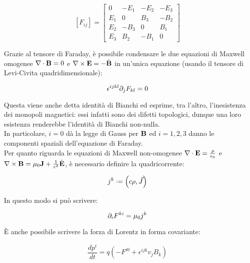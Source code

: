 \begin{equation}
	\left[F_{ij}\right] =
	\begin{bmatrix}
		0 & -E_1 & -E_2 & -E_3 \\
		E_1 & 0 & B_3 & -B_2 \\
		E_2 & -B_3 & 0 & B_1 \\
		E_3 & B_2 & -B_1 & 0
	\end{bmatrix}
	\label{eq:2.24}
\end{equation}

Grazie al tensore di Faraday, è possibile condensare le due equazioni di Maxwell omogenee $ \nabla\cdot\mathbf{B} = 0 $ e $ \nabla\times\mathbf{E} = - \dot{\mathbf{B}} $ in un'unica equazione (usando il tensore di Levi-Civita quadridimensionale):

\begin{equation}
	\epsilon^{ijkl} \partial_j F_{kl} = 0
	\label{eq:2.25}
\end{equation}

Questa viene anche detta identità di Bianchi ed esprime, tra l'altro, l'inesistenza dei monopoli magnetici: essi infatti sono dei difetti topologici, dunque una loro esistenza renderebbe l'identità di Bianchi non-nulla.\\
In particolare, $ i = 0 $ dà la legge di Gauss per $ \mathbf{B} $ ed $ i = 1,2,3 $ danno le componenti spaziali dell'equazione di Faraday.\\
Per quanto riguarda le equazioni di Maxwell non-omogenee $ \nabla\cdot\mathbf{E} = \frac{\rho}{\epsilon_0} $ e $ \nabla\times\mathbf{B} = \mu_0 \mathbf{J} + \frac{1}{c^2} \dot{\mathbf{E}} $, è necessario definire la quadricorrente:

\begin{equation}
	j^k \defeq \left(c\rho, \vec{J}\right)
	\label{eq:2.26}
\end{equation}

In questo modo si può scrivere:

\begin{equation}
	\partial_i F^{ki} = \mu_0 j^k
	\label{eq:2.27}
\end{equation}

È anche possibile scrivere la forza di Lorentz in forma covariante:

\begin{equation}
	\frac{dp^i}{dt} = q \left(-F^{i0} + \epsilon^{ijk} v_j B_k\right)
	\label{eq:2.28}
\end{equation}

